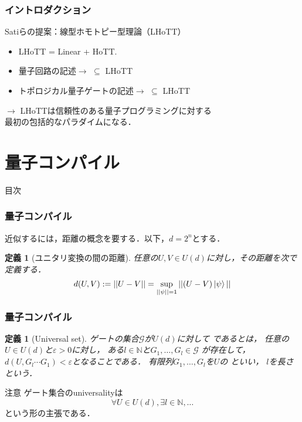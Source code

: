 \documentclass{beamer} %
\newcommand{\N}{\mathbb{N}}%
\renewcommand{\epsilon}{\varepsilon}
\renewcommand{\subset}{\subseteq}
\newtheorem{dfn}[thm]{定義}
\newcommand{\0}{\mathbf{0}}
\newcommand{\1}{\mathbf{1}}
\newcommand{\2}{\mathbf{2}}
\begin{document}
\begin{frame}
  \frametitle{イントロダクション}
  \begin{block}{Satiらの提案：線型ホモトピー型理論（LHoTT）}
    \begin{itemize}
      \item LHoTT = Linear + HoTT.
      \item 量子回路の記述\(\to\) \(\subset\) LHoTT
      \item トポロジカル量子ゲートの記述\(\to\)
             \(\subset\) LHoTT
    \end{itemize}
    \begin{center}
      \(\longrightarrow\)
      LHoTTは信頼性のある量子プログラミングに対する\\
      最初の包括的なパラダイムになる．
    \end{center}
  \end{block}
\end{frame}

\section{量子コンパイル}
\begin{frame}[noframenumbering]{目次}
  \tableofcontents[currentsection]
\end{frame}

\begin{frame}
  \frametitle{量子コンパイル}
  近似するには，距離の概念を要する．以下，\(d=2^n\)とする．
  \begin{dfn}[ユニタリ変換の間の距離]
    任意の\(U,V\in U(d)\)に対し，その距離を次で定義する．
    \[
      d(U,V):=||U-V||=\sup_{||\psi||=1}||(U-V)\ket{\psi}||
    \]
  \end{dfn}
\end{frame}

\begin{frame}
  \frametitle{量子コンパイル}
  \begin{dfn}[Universal set]
    ゲートの集合\(\mathcal{G}\)が\(U(d)\)に対して
    であるとは，
    任意の\(U\in U(d)\)と\(\epsilon >0\)に対し，
    ある\(l\in\N\)と\(G_1,\ldots,G_l\in\mathcal{G}\)
    が存在して，\(d(U,G_l\cdots G_1)<\epsilon\)となることである．
    有限列\(G_1,\ldots,G_l\)を\(U\)の
    \structure{\(\epsilon\)近似列}といい，
    \(l\)を長さという．
  \end{dfn}

  \begin{alertblock}{注意}
    ゲート集合のuniversalityは
    \[
      \forall U\in U(d),\exists l\in\N,\ldots
    \]
    という形の主張である．
  \end{alertblock}
\end{frame}
\end{document}
